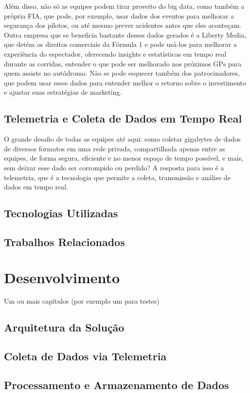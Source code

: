\documentclass[12pt, %
openright, 
oneside, %
a4paper,    %
brazil]{facom-ufu-abntex2}
\begin{document}
Além disso, não só as equipes podem tirar proveito do big data, como também a própria FIA, que pode, por exemplo, usar dados dos eventos
para melhorar a segurança dos pilotos, ou até mesmo prever acidentes antes que eles aconteçam. Outra empresa que se beneficia bastante desses
dados gerados é a Liberty Media, que detém os direitos comerciais da Fórmula 1 e pode usá-los para melhorar a experiência do espectador,
oferecendo insights e estatísticas em tempo real durante as corridas, entender o que pode ser melhorado nos próximos GPs para quem assiste
no autódromo. Não se pode esquecer também dos patrocinadores, que podem usar esses dados para entender melhor o retorno sobre o investimento
e ajustar suas estratégias de marketing.

\section{Telemetria e Coleta de Dados em Tempo Real}
O grande desafio de todas as equipes até aqui: como coletar gigabytes de dados de diversos formatos em uma rede privada, compartilhada apenas
entre as equipes, de forma segura, eficiente e no menor espaço de tempo possível, e mais, sem deixar esse dado ser corrompido ou perdido? 
A resposta para isso é a telemetria, que é a tecnologia que permite a coleta, transmissão e análise de dados em tempo real.

\section{Tecnologias Utilizadas}
\section{Trabalhos Relacionados}


\chapter{Desenvolvimento}
Um ou mais capítulos (por exemplo um para testes)
\section{Arquitetura da Solução}
\section{Coleta de Dados via Telemetria}
\section{Processamento e Armazenamento de Dados}
\end{document}

